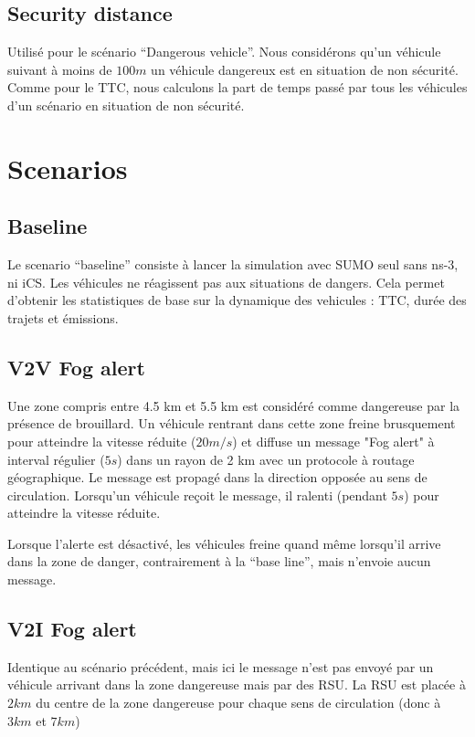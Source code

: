 \documentclass[a4paper,10pt]{article}
\begin{document}
\subsection{Security distance}

Utilisé pour le scénario ``Dangerous vehicle''. Nous considérons qu'un véhicule suivant à moins de $100 m$ un véhicule dangereux est en situation de non sécurité. Comme pour le TTC, nous calculons la part de temps passé par tous les véhicules d'un scénario en situation de non sécurité.

\section{Scenarios}

\subsection{Baseline}

Le scenario ``baseline'' consiste à lancer la simulation avec SUMO seul sans ns-3, ni iCS. Les véhicules ne réagissent pas aux situations de dangers. Cela permet d'obtenir les statistiques de base sur la dynamique des vehicules : TTC, durée des trajets et émissions.
\subsection{V2V Fog alert}

Une zone compris entre 4.5 km et 5.5 km est considéré comme dangereuse par la présence de brouillard. Un véhicule rentrant dans cette zone freine brusquement pour atteindre la vitesse réduite ($20 m/s$) et diffuse un message "Fog alert" à interval régulier ($5 s$) dans un rayon de 2 km avec un protocole à routage géographique. Le message est propagé dans la direction opposée au sens de circulation. Lorsqu'un véhicule reçoit le message, il ralenti (pendant $5s$) pour atteindre la vitesse réduite.

Lorsque l'alerte est désactivé, les véhicules freine quand même lorsqu'il arrive dans la zone de danger, contrairement à la ``base line'', mais n’envoie aucun message.


\subsection{V2I Fog alert}

Identique au scénario précédent, mais ici le message n'est pas envoyé par un véhicule arrivant dans la zone dangereuse mais par des RSU. La RSU est placée à $2 km$ du centre de la zone dangereuse pour chaque sens de circulation (donc à $3 km$ et $7 km$)
\end{document}
